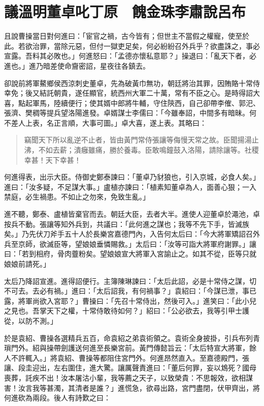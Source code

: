 
\chapter{議溫明董卓叱丁原　餽金珠李肅說呂布}

且說曹操當日對何進曰：「宦官之禍，古今皆有；但世主不當假之權寵，使至於此。若欲治罪，當除元惡，但付一獄吏足矣，何必紛紛召外兵乎？欲盡誅之，事必宣露。吾料其必敗也。」何進怒曰：「孟德亦懷私意耶？」操退曰：「亂天下者，必進也。」進乃暗差使命齎密詔，星夜往各鎮去。

卻說前將軍鰲鄉侯西涼刺史董卓，先為破黃巾無功，朝廷將治其罪，因賄賂十常侍幸免；後又結託朝貴，遂任顯官，統西州大軍二十萬，常有不臣之心。是時得詔大喜，點起軍馬，陸續便行；使其婿中郎將牛輔，守住陝西，自己卻帶李傕、郭汜、張濟、樊稠等提兵望洛陽進發。卓婿謀士李儒曰：「今雖奉詔，中間多有暗昧。何不差人上表，名正言順，大事可圖。」卓大喜，遂上表。其略曰：

\begin{quote}
竊聞天下所以亂逆不止者，皆由黃門常侍張讓等侮慢天常之故。臣聞揚湯止沸，不如去薪；潰癰雖痛，勝於養毒。臣敢鳴鐘鼓入洛陽，請除讓等。社稷幸甚！天下幸甚！
\end{quote}

何進得表，出示大臣。侍御史鄭泰諫曰：「董卓乃豺狼也，引入京城，必食人矣。」進曰：「汝多疑，不足謀大事。」盧植亦諫曰：「植素知董卓為人，面善心狠；一入禁庭，必生禍患。不如止之勿來，免致生亂。」

進不聽，鄭泰、盧植皆棄官而去。朝廷大臣，去者大半。進使人迎董卓於澠池，卓按兵不動。張讓等知外兵到，共議曰：「此何進之謀也；我等不先下手，皆滅族矣。」乃先伏刀斧手五十人於長樂宮嘉德門內，入告何太后曰：「今大將軍矯詔召外兵至京師，欲滅臣等，望娘娘垂憐賜救。」太后曰：「汝等可詣大將軍府謝罪。」讓曰：「若到相府，骨肉虀粉矣。望娘娘宣大將軍入宮諭止之。如其不從，臣等只就娘娘前請死。」

太后乃降詔宣進。進得詔便行。主簿陳琳諫曰：「太后此詔，必是十常侍之謀，切不可去。去必有禍。」進曰：「太后詔我，有何禍事？」袁紹曰：「今謀已泄，事已露，將軍尚欲入宮耶？」曹操曰：「先召十常侍出，然後可入。」進笑曰：「此小兒之見也。吾掌天下之權，十常侍敢待如何？」紹曰：「公必欲去，我等引甲士護從，以防不測。」

於是袁紹、曹操各選精兵五百，命袁紹之弟袁術領之。袁術全身披掛，引兵布列青瑣門外。紹與操帶劍護送何進至長樂宮前。黃門傳懿旨云：「太后特宣大將軍，餘人不許輒入。」將袁紹、曹操等都阻住宮門外。何進昂然直入。至嘉德殿門，張讓、段圭迎出，左右圍住，進大驚。讓厲聲責進曰：「董后何罪，妄以鴆死？國母喪葬，託疾不出！汝本屠沽小輩，我等薦之天子，以致榮貴：不思報效，欲相謀害！汝言我等甚濁，其清者是誰？」進慌急，欲尋出路，宮門盡閉，伏甲齊出，將何進砍為兩段。後人有詩歎之曰：

